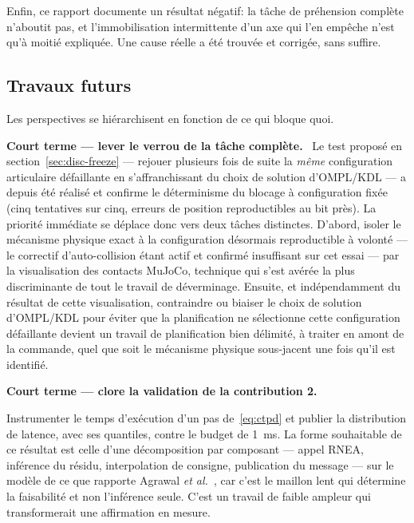 \documentclass[a4paper, oneside]{article}
\newcommand{\parag}[1]{%
    \par\medskip\noindent\textbf{#1}\ \ignorespaces%
}
\begin{document}
Enfin, ce rapport documente un résultat négatif: la tâche de préhension
complète n'aboutit pas, et l'immobilisation intermittente d'un axe qui l'en
empêche n'est qu'à moitié expliquée. Une cause réelle a été trouvée et corrigée,
sans suffire.

\subsection{Travaux futurs}
\label{sec:futur}

Les perspectives se hiérarchisent en fonction de ce qui bloque quoi.

\parag{Court terme — lever le verrou de la tâche complète.} Le test proposé en
section~\ref{sec:disc-freeze} — rejouer plusieurs fois de suite la
\emph{même} configuration articulaire défaillante en s'affranchissant du choix
de solution d'OMPL/KDL — a depuis été réalisé et confirme le déterminisme du
blocage à configuration fixée (cinq tentatives sur cinq, erreurs de position
reproductibles au bit près). La priorité immédiate se déplace donc vers deux
tâches distinctes. D'abord, isoler le mécanisme physique exact à la
configuration désormais reproductible à volonté — le correctif d'auto-collision
étant actif et confirmé insuffisant sur cet essai — par la visualisation des
contacts MuJoCo, technique qui s'est avérée la plus discriminante de tout le
travail de déverminage. Ensuite, et indépendamment du résultat de cette
visualisation, contraindre ou biaiser le choix de solution d'OMPL/KDL pour
éviter que la planification ne sélectionne cette configuration défaillante
devient un travail de planification bien délimité, à traiter en amont de la
commande, quel que soit le mécanisme physique sous-jacent une fois qu'il est
identifié.

\parag{Court terme — clore la validation de la contribution 2.}
Instrumenter le temps d'exécution d'un pas de~\eqref{eq:ctpd} et publier la
distribution de latence, avec ses quantiles, contre le budget de 1~ms. La forme
souhaitable de ce résultat est celle d'une décomposition par composant — appel
RNEA, inférence du résidu, interpolation de consigne, publication du message —
sur le modèle de ce que rapporte Agrawal \emph{et al.}~\cite{agrawal2026}, car
c'est le maillon lent qui détermine la faisabilité et non l'inférence seule.
C'est un travail de faible ampleur qui transformerait une affirmation en mesure.
\end{document}
